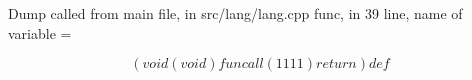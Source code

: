 \documentclass{article}
\begin{document}
Dump called from main file, in src/lang/lang.cpp func, in 39 line, name of variable = 


$$
(void(void) funcall (1111) return ) def 
$$
\end{document}

